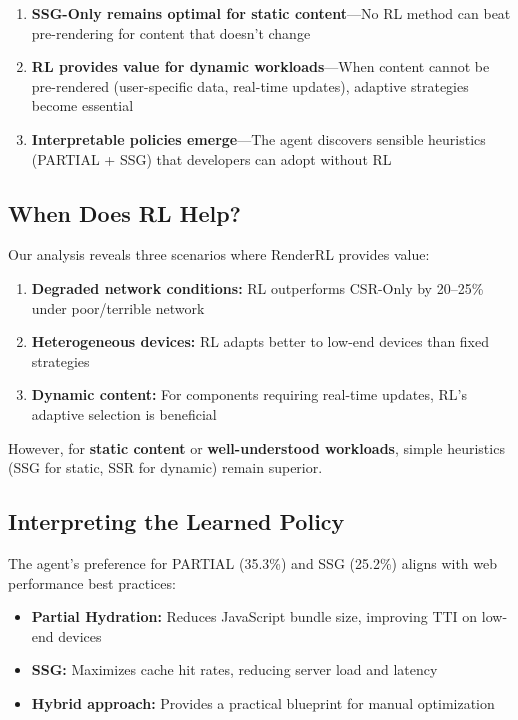 \documentclass[10pt,twocolumn]{article}
\newcommand{\method}{RenderRL}
\begin{document}
\begin{enumerate}[nosep]
\item \textbf{SSG-Only remains optimal for static content}---No RL method can beat pre-rendering for content that doesn't change
\item \textbf{RL provides value for dynamic workloads}---When content cannot be pre-rendered (user-specific data, real-time updates), adaptive strategies become essential
\item \textbf{Interpretable policies emerge}---The agent discovers sensible heuristics (PARTIAL + SSG) that developers can adopt without RL
\end{enumerate}

\subsection{When Does RL Help?}

Our analysis reveals three scenarios where \method{} provides value:

\begin{enumerate}[nosep]
\item \textbf{Degraded network conditions:} RL outperforms CSR-Only by 20--25\% under poor/terrible network
\item \textbf{Heterogeneous devices:} RL adapts better to low-end devices than fixed strategies
\item \textbf{Dynamic content:} For components requiring real-time updates, RL's adaptive selection is beneficial
\end{enumerate}

However, for \textbf{static content} or \textbf{well-understood workloads}, simple heuristics (SSG for static, SSR for dynamic) remain superior.

\subsection{Interpreting the Learned Policy}

The agent's preference for PARTIAL (35.3\%) and SSG (25.2\%) aligns with web performance best practices:

\begin{itemize}[nosep]
\item \textbf{Partial Hydration:} Reduces JavaScript bundle size, improving TTI on low-end devices
\item \textbf{SSG:} Maximizes cache hit rates, reducing server load and latency
\item \textbf{Hybrid approach:} Provides a practical blueprint for manual optimization
\end{itemize}
\end{document}
